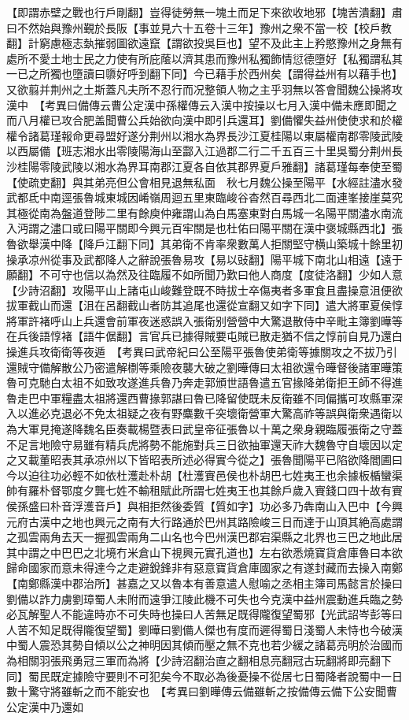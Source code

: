 【即謂赤壁之戰也行戶剛翻】豈得徒勞無一塊土而足下來欲收地邪【塊苦潰翻】肅曰不然始與豫州覲於長阪【事並見六十五卷十三年】豫州之衆不當一校【校戶教翻】計窮慮極志埶摧弱圖欲遠竄【謂欲投吳巨也】望不及此主上矜愍豫州之身無有處所不愛土地士民之力使有所庇䕃以濟其患而豫州私獨飾情愆德墮好【私獨謂私其一已之所獨也墮讀曰隳好呼到翻下同】今已藉手於西州矣【謂得益州有以藉手也】又欲翦并荆州之土斯蓋凡夫所不忍行而况整領人物之主乎羽無以答會聞魏公操將攻漢中　【考異曰備傳云曹公定漢中孫權傳云入漢中按操以七月入漢中備未應即聞之而八月權已攻合肥盖聞曹公兵始欲向漢中即引兵還耳】劉備懼失益州使使求和於權權令諸葛瑾報命更尋盟好遂分荆州以湘水為界長沙江夏桂陽以東屬權南郡零陵武陵以西屬備【班志湘水出零陵陽海山至酃入江過郡二行二千五百三十里吳蜀分荆州長沙桂陽零陵武陵以湘水為界耳南郡江夏各自依其郡界夏戶雅翻】諸葛瑾每奉使至蜀【使疏吏翻】與其弟亮但公會相見退無私面　秋七月魏公操至陽平【水經註濜水發武都氐中南逕張魯城東城因崤嶺周迴五里東臨峻谷杳然百尋西北二面連峯接崖莫究其極從南為盤道登陟二里有餘庾仲雍謂山為白馬塞東對白馬城一名陽平關濜水南流入沔謂之濜口或曰陽平關即今興元百牢關是也杜佑曰陽平關在漢中褒城縣西北】張魯欲舉漢中降【降戶江翻下同】其弟衛不肯率衆數萬人拒關堅守横山築城十餘里初操承凉州從事及武都降人之辭說張魯易攻【易以䜴翻】陽平城下南北山相遠【遠于願翻】不可守也信以為然及往臨履不如所聞乃歎曰他人商度【度徒洛翻】少如人意【少詩沼翻】攻陽平山上諸屯山峻難登既不時拔士卒傷夷者多軍食且盡操意沮便欲拔軍截山而還【沮在呂翻截山者防其追尾也還從宣翻又如字下同】遣大將軍夏侯惇將軍許褚呼山上兵還會前軍夜迷惑誤入張衛别營營中大驚退散侍中辛毗主簿劉曄等在兵後語惇褚【語牛倨翻】言官兵已據得賊要屯賊已散走猶不信之惇前自見乃還白操進兵攻衛衛等夜遁　【考異曰武帝紀曰公至陽平張魯使弟衛等據關攻之不拔乃引還賊守備解散公乃密遣解檦等乘險夜襲大破之劉曄傳曰太祖欲還令曄督後諸軍曄策魯可克馳白太祖不如致攻遂進兵魯乃奔走郭頒世語魯遣五官掾降弟衛拒王師不得進魯走巴中軍糧盡太祖將還西曹掾郭諶曰魯已降留使既未反衛雖不同偏攜可攻縣軍深入以進必克退必不免太祖疑之夜有野麋數千突壞衛營軍大驚高祚等誤與衛衆遇衛以為大軍見掩遂降魏名臣奏載楊暨表曰武皇帝征張魯以十萬之衆身親臨履張衛之守蓋不足言地險守易雖有精兵虎將勢不能施對兵三日欲抽軍還天祚大魏魯守自壞因以定之又載董昭表其承凉州以下皆昭表所述必得實今從之】張魯聞陽平已陷欲降閻圃曰今以迫往功必輕不如依杜濩赴朴胡【杜濩賨邑侯也朴胡巴七姓夷王也余據板楯蠻渠帥有羅朴督鄂度夕龔七姓不輸租賦此所謂七姓夷王也其餘戶歲入賨錢口四十故有賨侯孫盛曰朴音浮濩音戶】與相拒然後委質【質如字】功必多乃犇南山入巴中【今興元府古漢中之地也興元之南有大行路通於巴州其路險峻三日而達于山頂其絶高處謂之孤雲兩角去天一握孤雲兩角二山名也今巴州漢巴郡宕渠縣之北界也三巴之地此居其中謂之中巴巴之北境冇米倉山下視興元實孔道也】左右欲悉燒寶貨倉庫魯曰本欲歸命國家而意未得達今之走避銳鋒非有惡意寶貨倉庫國家之有遂封藏而去操入南鄭【南鄭縣漢中郡治所】甚嘉之又以魯本有善意遣人慰喻之丞相主簿司馬懿言於操曰劉備以詐力虜劉璋蜀人未附而遠爭江陵此機不可失也今克漢中益州震動進兵臨之勢必瓦解聖人不能違時亦不可失時也操曰人苦無足既得隴復望蜀邪【光武詔岑彭等曰人苦不知足既得隴復望蜀】劉曄曰劉備人傑也有度而遲得蜀日淺蜀人未恃也今破漢中蜀人震恐其勢自傾以公之神明因其傾而壓之無不克也若少緩之諸葛亮明於治國而為相關羽張飛勇冠三軍而為將【少詩沼翻治直之翻相息亮翻冠古玩翻將即亮翻下同】蜀民既定據險守要則不可犯矣今不取必為後憂操不從居七日蜀降者說蜀中一日數十驚守將雖斬之而不能安也　【考異曰劉曄傳云備雖斬之按備傳云備下公安聞曹公定漢中乃還如